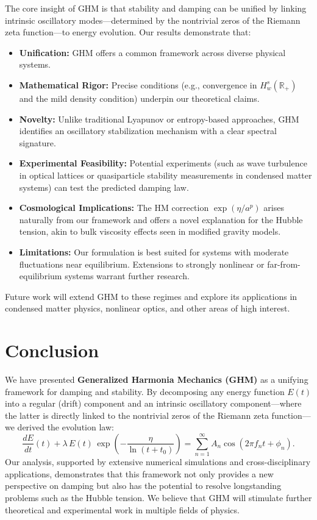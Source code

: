 \documentclass[11pt]{article}
\begin{document}
The core insight of GHM is that stability and damping can be unified by linking intrinsic oscillatory modes---determined by the nontrivial zeros of the Riemann zeta function---to energy evolution. Our results demonstrate that:
\begin{itemize}
    \item \textbf{Unification:} GHM offers a common framework across diverse physical systems.
    \item \textbf{Mathematical Rigor:} Precise conditions (e.g., convergence in $H_w^s(\mathbb{R}_{+})$ and the mild density condition) underpin our theoretical claims.
    \item \textbf{Novelty:} Unlike traditional Lyapunov or entropy-based approaches, GHM identifies an oscillatory stabilization mechanism with a clear spectral signature.
    \item \textbf{Experimental Feasibility:} Potential experiments (such as wave turbulence in optical lattices or quasiparticle stability measurements in condensed matter systems) can test the predicted damping law.
    \item \textbf{Cosmological Implications:} The HM correction $\exp(\eta/a^p)$ arises naturally from our framework and offers a novel explanation for the Hubble tension, akin to bulk viscosity effects seen in modified gravity models.
    \item \textbf{Limitations:} Our formulation is best suited for systems with moderate fluctuations near equilibrium. Extensions to strongly nonlinear or far-from-equilibrium systems warrant further research.
\end{itemize}

Future work will extend GHM to these regimes and explore its applications in condensed matter physics, nonlinear optics, and other areas of high interest.

\section{Conclusion}

We have presented \textbf{Generalized Harmonia Mechanics (GHM)} as a unifying framework for damping and stability. By decomposing any energy function $E(t)$ into a regular (drift) component and an intrinsic oscillatory component---where the latter is directly linked to the nontrivial zeros of the Riemann zeta function---we derived the evolution law:
\[
\frac{dE}{dt}(t)+\lambda\,E(t)\,\exp\left(-\frac{\eta}{\ln(t+t_{0})}\right)=\sum_{n=1}^{\infty} A_n \cos\left(2\pi f_n t+\phi_n\right).
\]
Our analysis, supported by extensive numerical simulations and cross-disciplinary applications, demonstrates that this framework not only provides a new perspective on damping but also has the potential to resolve longstanding problems such as the Hubble tension. We believe that GHM will stimulate further theoretical and experimental work in multiple fields of physics.
\end{document}
